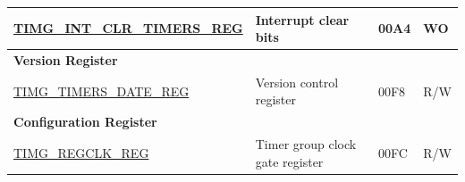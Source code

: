 \begin{longtable}{ | p{6cm} | p{7.2cm} | p{1.3cm} | p{1cm} | }
\hyperref[regdesc:TIMGINTCLRTIMERSREG]{TIMG\_INT\_CLR\_TIMERS\_REG} & Interrupt clear bits & \hexprefix{}00A4 & WO \\ \hline
\multicolumn{4}{|l|}{\textbf{Version Register}} \\ \hline
\hyperref[regdesc:TIMGTIMERSDATEREG]{TIMG\_TIMERS\_DATE\_REG} & Version control register & \hexprefix{}00F8 & R/W \\ \hline
\multicolumn{4}{|l|}{\textbf{Configuration Register}} \\ \hline
\hyperref[regdesc:TIMGREGCLKREG]{TIMG\_REGCLK\_REG} & Timer group clock gate register & \hexprefix{}00FC & R/W \\ \hline
\end{longtable}
